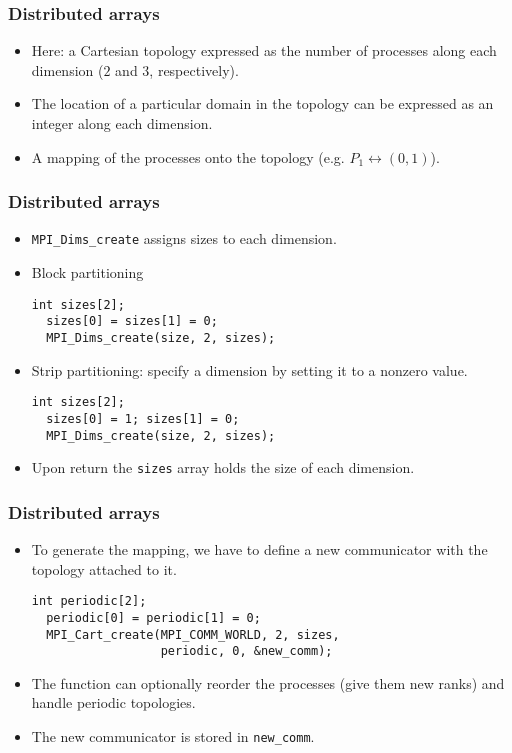\begin{frame}
  \frametitle{Distributed arrays}
  \begin{itemize}
  \item Here: a Cartesian topology expressed as the number of processes along
    each dimension ($2$ and $3$, respectively).
  \item The location of a particular domain in the topology can be expressed as
    an integer along each dimension.
  \item A mapping of the processes onto the topology (e.g. $P_1 \leftrightarrow
    (0,1)$).
  \end{itemize}
\end{frame}

\begin{frame}[fragile]
  \frametitle{Distributed arrays}
  \begin{itemize}
  \item \texttt{MPI\_Dims\_create} assigns sizes to each dimension.
  \item Block partitioning
\begin{lstlisting}[style=c]
  int sizes[2];
  sizes[0] = sizes[1] = 0;
  MPI_Dims_create(size, 2, sizes);
\end{lstlisting}
  \item Strip partitioning: specify a dimension by setting it to a nonzero
    value.
\begin{lstlisting}[style=c]
  int sizes[2];
  sizes[0] = 1; sizes[1] = 0;
  MPI_Dims_create(size, 2, sizes);
\end{lstlisting}
  \item Upon return the \texttt{sizes} array holds the size of each dimension.
  \end{itemize}
\end{frame}

\begin{frame}[fragile]
  \frametitle{Distributed arrays}
  \begin{itemize}
  \item To generate the mapping, we have to define a new communicator with the
    topology attached to it.
\begin{lstlisting}[style=c]
  int periodic[2];
  periodic[0] = periodic[1] = 0;
  MPI_Cart_create(MPI_COMM_WORLD, 2, sizes,
                  periodic, 0, &new_comm);
\end{lstlisting}
  \item The function can optionally reorder the processes (give them new ranks)
    and handle periodic topologies.
  \item The new communicator is stored in \texttt{new\_comm}.
  \end{itemize}
\end{frame}

